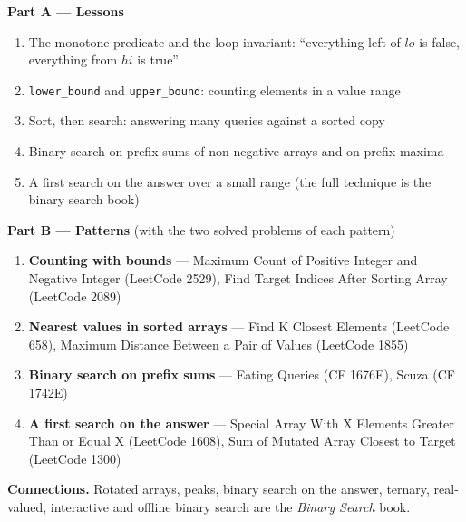 \begin{plannedbox}
\textbf{Part A --- Lessons}
\begin{enumerate}[leftmargin=*, label=\textbf{A\arabic*.}, itemsep=1pt]
    \item The monotone predicate and the loop invariant: ``everything left of $lo$ is false, everything from $hi$ is true''
    \item \texttt{lower\_bound} and \texttt{upper\_bound}: counting elements in a value range
    \item Sort, then search: answering many queries against a sorted copy
    \item Binary search on prefix sums of non-negative arrays and on prefix maxima
    \item A first search on the answer over a small range (the full technique is the binary search book)
\end{enumerate}
\textbf{Part B --- Patterns} (with the two solved problems of each pattern)
\begin{enumerate}[leftmargin=*, label=\textbf{P\arabic*.}, itemsep=1pt]
    \item \textbf{Counting with bounds} --- Maximum Count of Positive Integer and Negative Integer {\small\color{darkgray}(LeetCode 2529)}, Find Target Indices After Sorting Array {\small\color{darkgray}(LeetCode 2089)}
    \item \textbf{Nearest values in sorted arrays} --- Find K Closest Elements {\small\color{darkgray}(LeetCode 658)}, Maximum Distance Between a Pair of Values {\small\color{darkgray}(LeetCode 1855)}
    \item \textbf{Binary search on prefix sums} --- Eating Queries {\small\color{darkgray}(CF 1676E)}, Scuza {\small\color{darkgray}(CF 1742E)}
    \item \textbf{A first search on the answer} --- Special Array With X Elements Greater Than or Equal X {\small\color{darkgray}(LeetCode 1608)}, Sum of Mutated Array Closest to Target {\small\color{darkgray}(LeetCode 1300)}
\end{enumerate}
\textbf{Connections.} Rotated arrays, peaks, binary search on the answer, ternary, real-valued, interactive and offline binary search are the \textit{Binary Search} book.
\end{plannedbox}
